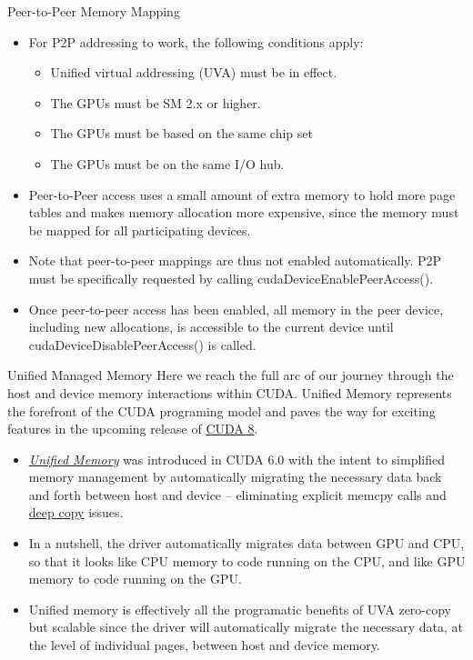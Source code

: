 \documentclass{beamer}
\begin{document}
\begin{frame}{Peer-to-Peer Memory Mapping}
\begin{itemize}
    \item<1->For P2P addressing to work, the following conditions apply:
    \begin{itemize}
        \item<1->Unified virtual addressing (UVA) must be in effect.
        \item<1->The GPUs must be SM 2.x or higher.
        \item<1->The GPUs must be based on the same chip set
        \item<1->The GPUs must be on the same I/O hub.
    \end{itemize}
    \item<1-> Peer-to-Peer access uses a small amount of extra memory to hold more page tables and makes memory allocation more expensive, since the memory must be mapped for all participating devices.
    \item<1->Note that peer-to-peer mappings are thus not enabled automatically.  P2P must be specifically requested by calling {\selectfont cudaDeviceEnablePeerAccess()}.
    \item<1->Once peer-to-peer access has been enabled, all memory in the peer device, including new allocations, is accessible to the current device until {\selectfont cudaDeviceDisablePeerAccess()} is called.
\end{itemize}
\end{frame}

\begin{frame}{Unified Managed Memory}
Here we reach the full arc of our journey through the host and device memory interactions within CUDA. Unified Memory represents the forefront of the CUDA programing model and paves the way for exciting features in the upcoming release of \href{https://devblogs.nvidia.com/parallelforall/cuda-8-features-revealed/}{\color{blue}CUDA 8}.

\begin{itemize}
    \item<1->\href{http://docs.nvidia.com/cuda/cuda-c-programming-guide/index.html\#um-unified-memory-programming-hd}{\color{blue}\emph{Unified Memory}} was introduced in CUDA 6.0 with the intent to simplified memory management by automatically migrating the necessary data back and forth between host and device -- eliminating explicit memcpy calls and  \href{https://devblogs.nvidia.com/parallelforall/unified-memory-in-cuda-6/}{\color{blue}deep copy} issues.
    \item<1->In a nutshell, the driver automatically migrates data between GPU and CPU, so that it looks like CPU memory to code running on the CPU, and like GPU memory to code running on the GPU.
    \item<1->Unified memory is effectively all the programatic benefits of UVA zero-copy but scalable since the driver will automatically migrate the necessary data, at the level of individual pages, between host and device memory.
\end{itemize}
\end{frame}
\end{document}
